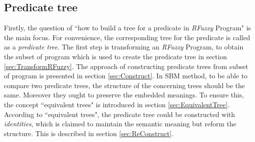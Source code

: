 \subsection{Predicate tree}
\label{sec:PredicateTree}
Firstly, the question of ``how to build a tree for a predicate in \textit{RFuzzy} Program" is the main focus. For convenience, the corresponding tree for the predicate is called as a \textit{predicate tree}. The first step is transforming an \textit{RFuzzy} Program, to obtain the subset of program which is used to create the predicate tree in section \ref{sec:TransformRFuzzy}. The approach of constructing predicate trees from subset of program is presented in section \ref{sec:Construct}. In {SBM} method, to be able to compare two predicate trees, the structure of the concerning trees should be the same. Moreover they ought to preserve the embedded meanings. To ensure this, the concept ``equivalent trees" is introduced in section \ref{sec:EquivalentTree}. According to ``equivalent trees", the predicate tree could be constructed with \textit{identities}, which is claimed to maintain the semantic meaning but reform the structure. This is described in section \ref{sec:ReConstruct}.





